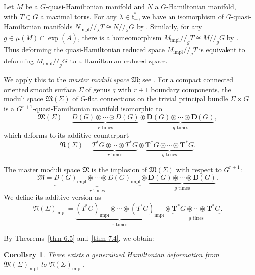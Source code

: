 \documentclass[reqno]{amsart}
\theoremstyle{plain}
\newtheorem{Cor}[Thm]{Corollary}
\theoremstyle{definition}
\begin{document}
Let $M$ be a $G$-quasi-Hamiltonian manifold and $N$ a $G$-Hamiltonian manifold, with $T \subset G$ a maximal torus. For any $\lambda \in \mathfrak{t}^*_+$, we have an isomorphism of $G$-quasi-Hamiltonian manifolds $N_{\mathrm{impl}} /\!/_\lambda T \cong N /\!/_\lambda G$ by \cite[Theorem~3.4]{guillemin2002}. Similarly, for any $g \in \mu(M) \cap \exp(\bar{A})$, there is a homeomorphism $M_{\mathrm{impl}} /\!/_g T \cong M /\!/_g G$ by \cite[Addendum~3.18]{hurtubise2006group}. Thus deforming the quasi-Hamiltonian reduced space $M_{\mathrm{impl}} /\!/_g T$ is equivalent to deforming $M_{\mathrm{impl}} /\!/_g G$ to a Hamiltonian reduced space.

We apply this to the \emph{master moduli space} $\mathfrak{M}$; see \cite[Section~6]{hurtubise2006group}. For a compact connected oriented smooth surface $\Sigma$ of genus $g$ with $r+1$ boundary components, the moduli space $\mathfrak{M}(\Sigma)$ of $G$-flat connections on the trivial principal bundle $\Sigma \times G$ is a $G^{r+1}$-quasi-Hamiltonian manifold isomorphic to
\[
\mathfrak{M}(\Sigma) = \underbrace{D(G) \circledast \cdots \circledast D(G)}_{r \text{ times}} \circledast \underbrace{\mathbf{D}(G) \circledast \cdots \circledast \mathbf{D}(G)}_{g \text{ times}},
\]
which deforms to its additive counterpart
\[
\mathfrak{N}(\Sigma) = \underbrace{T^*G \circledast \cdots \circledast T^*G}_{r \text{ times}} \circledast \underbrace{\mathbf{T^*}G \circledast \cdots \circledast \mathbf{T^*}G}_{g \text{ times}}.
\]

The master moduli space $\mathfrak{M}$ is the implosion of $\mathfrak{M}(\Sigma)$ with respect to $G^{r+1}$:
\[
\mathfrak{M} = \underbrace{D(G)_{\mathrm{impl}} \circledast \cdots \circledast D(G)_{\mathrm{impl}}}_{r \text{ times}} \circledast \underbrace{\mathbf{D}(G) \circledast \cdots \circledast \mathbf{D}(G)}_{g \text{ times}}.
\]
We define its additive version as
\[
\mathfrak{N}(\Sigma)_{\mathrm{impl}} = \underbrace{(T^*G)_{\mathrm{impl}} \circledast \cdots \circledast (T^*G)_{\mathrm{impl}}}_{r \text{ times}} \circledast \underbrace{\mathbf{T^*}G \circledast \cdots \circledast \mathbf{T^*}G}_{g \text{ times}}.
\]

By Theorems~\ref{thm 6.5} and~\ref{thm 7.4}, we obtain:

\begin{Cor}
There exists a generalized Hamiltonian deformation from $\mathfrak{M}(\Sigma)_{\mathrm{impl}}$ to $\mathfrak{N}(\Sigma)_{\mathrm{impl}}$.
\end{Cor}
\end{document}
